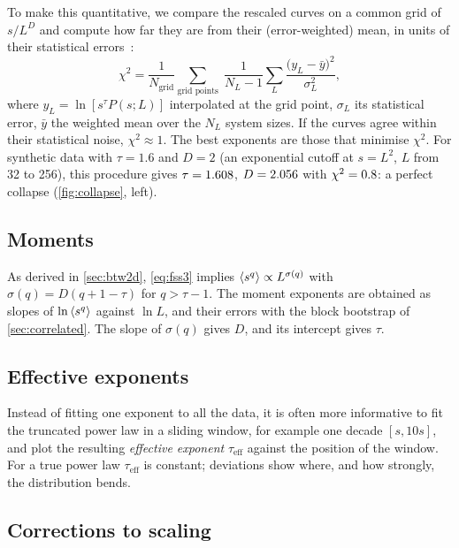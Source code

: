 To make this quantitative, we compare the rescaled curves on a common grid of $s/L^{D}$ and compute how far they are from their (error-weighted)
mean, in units of their statistical errors~\cite{BhattacharjeeSeno2001}:
\begin{equation}
  \chi^2 = \frac{1}{N_{\text{grid}}}\sum_{\text{grid points}}\;\frac{1}{N_L-1}\sum_{L}\frac{\bigl(y_L - \bar y\bigr)^2}{\sigma_L^2},
\end{equation}
where $y_L = \ln[s^{\tau}P(s;L)]$ interpolated at the grid point, $\sigma_L$ its statistical error, $\bar y$ the weighted mean over the $N_L$
system sizes. If the curves agree within their statistical noise, $\chi^2\approx1$. The best exponents are those that minimise $\chi^2$. For
synthetic data with $\tau=1.6$ and $D=2$ (an exponential cutoff at $s = L^2$, $L$ from 32 to 256), this procedure gives
$\tau = 1.608$, $D=2.056$ with $\chi^2=0.8$: a perfect collapse (\cref{fig:collapse}, left).

\subsection{Moments}

As derived in \cref{sec:btw2d}, \cref{eq:fss3} implies $\left\langle s^q \right\rangle\propto L^{\sigma(q)}$ with $\sigma(q) = D(q+1-\tau)$ for $q>\tau-1$. The
moment exponents are obtained as slopes of $\ln\left\langle s^q \right\rangle$ against $\ln L$, and their errors with the block bootstrap of
\cref{sec:correlated}. The slope of $\sigma(q)$ gives $D$, and its intercept gives $\tau$.

\subsection{Effective exponents}

Instead of fitting one exponent to all the data, it is often more informative to fit the truncated power law in a sliding window, for
example one decade $[s, 10s]$, and plot the resulting \emph{effective exponent} $\tau_{\text{eff}}$ against the position of the window.
For a true power law $\tau_{\text{eff}}$ is constant; deviations show where, and how strongly, the distribution bends.

\subsection{Corrections to scaling}

